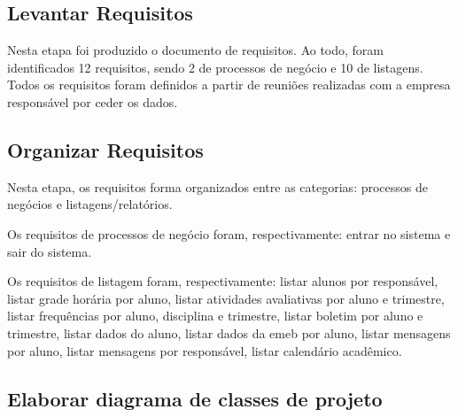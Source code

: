\subsection{Levantar Requisitos}

Nesta etapa foi produzido o documento de requisitos. Ao todo, foram identificados 12 requisitos, sendo 2 de processos de negócio e 10 de listagens. Todos os requisitos foram definidos a partir de reuniões realizadas com a empresa responsável por ceder os dados.

\subsection{Organizar Requisitos}

Nesta etapa, os requisitos forma organizados entre as categorias: processos de negócios e listagens/relatórios.

Os requisitos de processos de negócio foram, respectivamente: entrar no sistema e sair do sistema.

Os requisitos de listagem foram, respectivamente: listar alunos por responsável, listar grade horária por aluno, listar atividades avaliativas por aluno e trimestre, listar frequências por aluno, disciplina e trimestre, listar boletim por aluno e trimestre, listar dados do aluno, listar dados da emeb por aluno, listar mensagens por aluno, listar mensagens por responsável, listar calendário acadêmico.


\subsection{Elaborar diagrama de classes de projeto}


